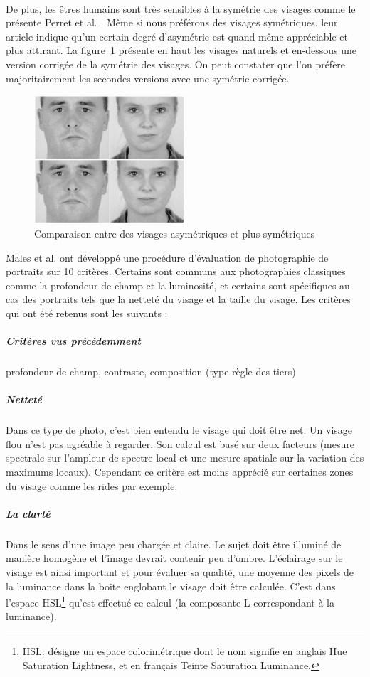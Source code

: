 \documentclass[11pt, french,screen]{report-rd-info}
\begin{document}
\paragraph*{}
De plus, les êtres humains sont très sensibles à la symétrie des visages comme le présente Perret et al. \cite{Perrett1999}. Même si nous préférons des visages symétriques, leur article indique qu'un certain degré d'asymétrie est quand même appréciable et plus attirant. La figure~\ref{fig:VisagesSymetriques} présente en haut les visages naturels et en-dessous une version corrigée de la symétrie des visages. On peut constater que l'on préfère majoritairement les secondes versions avec une symétrie corrigée.
\begin{figure}
	\centering
	\includegraphics[width=0.5\textwidth]{Images/ea_visages_symetriques}
	\caption{Comparaison entre des visages asymétriques et plus symétriques \cite{Perrett1999}}
	\label{fig:VisagesSymetriques}
\end{figure}
Males et al. \cite{Males2013} ont développé une procédure d'évaluation de photographie de portraits sur 10 critères. Certains sont communs aux photographies classiques comme la profondeur de champ et la luminosité, et certains sont spécifiques au cas des portraits tels que la netteté du visage et la taille du visage. Les critères qui ont été retenus sont les suivants :
\subparagraph{Critères vus précédemment} profondeur de champ, contraste, composition (type règle des tiers)
\subparagraph{Netteté} Dans ce type de photo, c'est bien entendu le visage qui doit être net. Un visage flou n'est pas agréable à regarder. Son calcul est basé sur deux facteurs (mesure spectrale sur l’ampleur de spectre local et une mesure spatiale sur la variation des maximums locaux). Cependant ce critère est moins apprécié sur certaines zones du visage comme les rides par exemple.
\subparagraph{La clarté} Dans le sens d'une image peu chargée et claire. Le sujet doit être illuminé de manière homogène et l’image devrait contenir peu d’ombre. L’éclairage sur le visage est ainsi important et pour évaluer sa qualité, une moyenne des pixels de la luminance dans la boite englobant le visage doit être calculée. C’est dans l’espace HSL\footnote{HSL: désigne un espace colorimétrique dont le nom signifie en anglais Hue Saturation Lightness, et en français Teinte Saturation Luminance.} qu’est effectué ce calcul (la composante L correspondant à la luminance).
\end{document}
